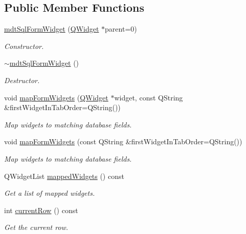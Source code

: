 \subsection*{Public Member Functions}
\begin{DoxyCompactItemize}
\item 
\hyperlink{classmdt_sql_form_widget_a53570f49eac1a7fa490546497c88ad13}{mdt\-Sql\-Form\-Widget} (\hyperlink{class_q_widget}{Q\-Widget} $\ast$parent=0)
\begin{DoxyCompactList}\small\item\em Constructor. \end{DoxyCompactList}\item 
\hyperlink{classmdt_sql_form_widget_a38df8efea5c216ea2b6f047e3280aac5}{$\sim$mdt\-Sql\-Form\-Widget} ()
\begin{DoxyCompactList}\small\item\em Destructor. \end{DoxyCompactList}\item 
void \hyperlink{classmdt_sql_form_widget_ad7933613a2d113d403d539ac8957e044}{map\-Form\-Widgets} (\hyperlink{class_q_widget}{Q\-Widget} $\ast$widget, const Q\-String \&first\-Widget\-In\-Tab\-Order=Q\-String())
\begin{DoxyCompactList}\small\item\em Map widgets to matching database fields. \end{DoxyCompactList}\item 
void \hyperlink{classmdt_sql_form_widget_ace4f7fad749a4efe1233b61d071b3926}{map\-Form\-Widgets} (const Q\-String \&first\-Widget\-In\-Tab\-Order=Q\-String())
\begin{DoxyCompactList}\small\item\em Map widgets to matching database fields. \end{DoxyCompactList}\item 
Q\-Widget\-List \hyperlink{classmdt_sql_form_widget_a92648a10dd7e830faca0989007c49b6e}{mapped\-Widgets} () const 
\begin{DoxyCompactList}\small\item\em Get a list of mapped widgets. \end{DoxyCompactList}\item 
int \hyperlink{classmdt_sql_form_widget_a9588fdc58b30440077b8dcfa3a2fb3c0}{current\-Row} () const 
\begin{DoxyCompactList}\small\item\em Get the current row. \end{DoxyCompactList}\end{DoxyCompactItemize}
